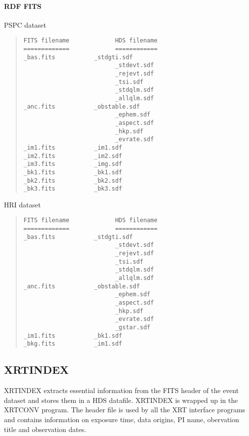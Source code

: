 \documentclass{book}
\renewcommand{\_}{{\tt\char'137}}     %
\begin{document}
\paragraph{RDF FITS}
PSPC dataset
\begin{quote}\begin{verbatim}
FITS filename             HDS filename
=============             ============
_bas.fits           _stdgti.sdf
                          _stdevt.sdf
                          _rejevt.sdf
                          _tsi.sdf
                          _stdqlm.sdf
                          _allqlm.sdf
_anc.fits           _obstable.sdf
                          _ephem.sdf
                          _aspect.sdf
                          _hkp.sdf
                          _evrate.sdf
_im1.fits           _im1.sdf
_im2.fits           _im2.sdf
_im3.fits           _img.sdf
_bk1.fits           _bk1.sdf
_bk2.fits           _bk2.sdf
_bk3.fits           _bk3.sdf
\end{verbatim}\end{quote}
HRI dataset
\begin{quote}\begin{verbatim}
FITS filename             HDS filename
=============             ============
_bas.fits           _stdgti.sdf
                          _stdevt.sdf
                          _rejevt.sdf
                          _tsi.sdf
                          _stdqlm.sdf
                          _allqlm.sdf
_anc.fits           _obstable.sdf
                          _ephem.sdf
                          _aspect.sdf
                          _hkp.sdf
                          _evrate.sdf
                          _gstar.sdf
_im1.fits           _bk1.sdf
_bkg.fits           _im1.sdf
\end{verbatim}\end{quote}
\subsection{XRTINDEX}
XRTINDEX extracts essential information from the FITS header of the event
dataset and stores them in a HDS datafile. XRTINDEX is wrapped up in the
XRTCONV program. The header file is used by all the XRT interface
programs and contains information on exposure time, data origins, PI name,
obervation title and observation dates.
\end{document}
